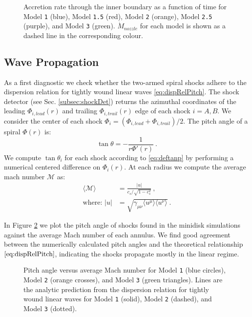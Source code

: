 \documentclass{emulateapj}
\newcommand{\model}[1]{{Model \texttt{#1}}}
\begin{document}
\begin{figure}
\caption{\label{fi:mdot_all} Accretion rate through the inner boundary as a function of time for \model{1} (blue), \model{1.5} (red), \model{2} (orange), \model{2.5} (purple), and \model{3} (green).  $\dot{M}_{nozzle}$ for each model is shown as a dashed line in the corresponding colour.}
\end{figure}

\subsection{Wave Propagation}
\label{subsec:res-prop}

As a first diagnostic we check whether the two-armed spiral shocks adhere to the dispersion relation for tightly wound linear waves \eqref{eq:dispRelPitch}.  The shock detector (see Sec. \ref{subsec:shockDet}) returns the azimuthal coordinates of the leading $\Phi_{i,lead}(r)$ and trailing $\Phi_{i,trail}(r)$ edge of each shock $i=A,B$.  We consider the center of each shock $\Phi_i = (\Phi_{i,lead} + \Phi_{i,trail}) / 2$.  The pitch angle of a spiral $\Phi(r)$ is:
\begin{equation}
	\tan \theta = -\frac{1}{r \Phi'(r)} \ . \label{eq:deftanp} 
\end{equation}
We compute $\tan \theta_i$ for each shock according to \eqref{eq:deftanp} by performing a numerical centered difference on $\Phi_i(r)$.  At each radius we compute the average mach number $\mathcal{M}$ as:
\begin{align}
	\langle \mathcal{M} \rangle &=  \frac{|u|}{c_s / \sqrt{1-c_s^2}} \ , \\
	\text{where: } |u| &= \sqrt{\gamma_{\mu\nu} \langle u^\mu \rangle  \langle u^\nu \rangle} \nonumber \ .
\end{align}

In Figure \ref{fi:disp} we plot the pitch angle of shocks found in the minidisk simulations against the average Mach number of each annulus. We find good agreement between the numerically calculated pitch angles and the theoretical relationship $\eqref{eq:dispRelPitch}$, indicating the shocks propagate mostly in the linear regime.

\begin{figure}
\caption{\label{fi:disp} Pitch angle versus average Mach number for \model{1} (blue circles), \model{2} (orange crosses), and \model{3} (green triangles). Lines are the analytic prediction from the dispersion relation for tightly wound linear waves for \model{1} (solid), \model{2} (dashed), and \model{3} (dotted).}
\end{figure}
\end{document}

